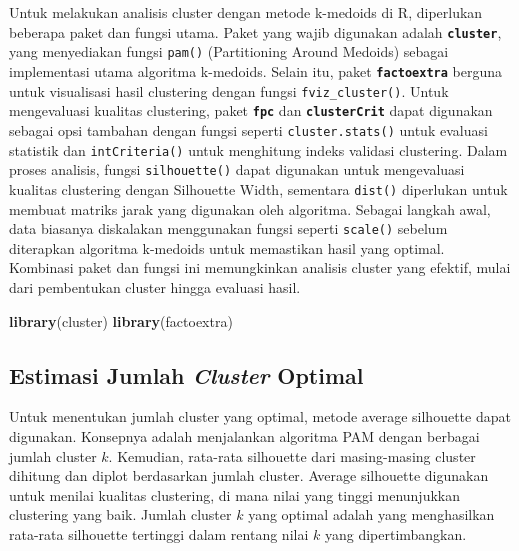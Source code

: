 \documentclass[
  oneside]{book}
\newenvironment{Shaded}{\begin{snugshade}}{\end{snugshade}}
\newcommand{\FunctionTok}[1]{\textcolor[rgb]{0.13,0.29,0.53}{\textbf{#1}}}
\newcommand{\NormalTok}[1]{#1}
\begin{document}
Untuk melakukan analisis cluster dengan metode k-medoids di R, diperlukan beberapa paket dan fungsi utama. Paket yang wajib digunakan adalah \textbf{\texttt{cluster}}, yang menyediakan fungsi \texttt{pam()} (Partitioning Around Medoids) sebagai implementasi utama algoritma k-medoids. Selain itu, paket \textbf{\texttt{factoextra}} berguna untuk visualisasi hasil clustering dengan fungsi \texttt{fviz\_cluster()}. Untuk mengevaluasi kualitas clustering, paket \textbf{\texttt{fpc}} dan \textbf{\texttt{clusterCrit}} dapat digunakan sebagai opsi tambahan dengan fungsi seperti \texttt{cluster.stats()} untuk evaluasi statistik dan \texttt{intCriteria()} untuk menghitung indeks validasi clustering. Dalam proses analisis, fungsi \texttt{silhouette()} dapat digunakan untuk mengevaluasi kualitas clustering dengan Silhouette Width, sementara \texttt{dist()} diperlukan untuk membuat matriks jarak yang digunakan oleh algoritma. Sebagai langkah awal, data biasanya diskalakan menggunakan fungsi seperti \texttt{scale()} sebelum diterapkan algoritma k-medoids untuk memastikan hasil yang optimal. Kombinasi paket dan fungsi ini memungkinkan analisis cluster yang efektif, mulai dari pembentukan cluster hingga evaluasi hasil.

\begin{Shaded}
\begin{Highlighting}[]
\FunctionTok{library}\NormalTok{(cluster)}
\FunctionTok{library}\NormalTok{(factoextra)}
\end{Highlighting}
\end{Shaded}

\subsection*{\texorpdfstring{Estimasi Jumlah \emph{Cluster} Optimal}{Estimasi Jumlah Cluster Optimal}}\label{estimasi-jumlah-cluster-optimal-1}

Untuk menentukan jumlah cluster yang optimal, metode average silhouette dapat digunakan. Konsepnya adalah menjalankan algoritma PAM dengan berbagai jumlah cluster \(k\). Kemudian, rata-rata silhouette dari masing-masing cluster dihitung dan diplot berdasarkan jumlah cluster. Average silhouette digunakan untuk menilai kualitas clustering, di mana nilai yang tinggi menunjukkan clustering yang baik. Jumlah cluster \(k\) yang optimal adalah yang menghasilkan rata-rata silhouette tertinggi dalam rentang nilai \(k\) yang dipertimbangkan.
\end{document}
